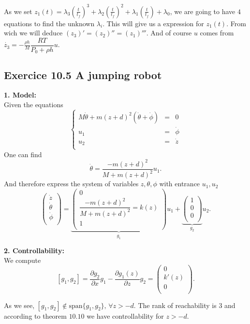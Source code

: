 As we set $z_{1}(t)=\lambda_{3}(\frac{t}{t_{f}})^{3}+\lambda_{2}(\frac{t}{t_{f}})^{2}+\lambda_{1}(\frac{t}{t_{f}})+\lambda_{0}$, we are going to have $4$ equations to find the unknown $\lambda_{i}$. This will give us a expression for $z_{1}(t)$. From wich we will deduce $(z_{3})'=(z_{2})''=(z_{1})'''$. And of course $u$ comes from $\dot{z_{3}}  =  -\frac{\rho h}{M}\dfrac{RT}{P_{0}+\rho h}u$.

\subsection*{Exercice 10.5 A jumping robot}

\textbf{1. Model:}\\

Given the equations 
$$\left\{ \begin{array}{rrr}
M\dot{\theta}+ m(z+d)^{2}(\dot{\theta}+\dot{\phi}) & = & 0\\
u_{1} & = & \dot{\phi}\\
u_{2} & = & \dot{z}\\
\end{array}\right.$$
One can find $$\dot{\theta}=\dfrac{-m(z+d)^{2}}{M+m(z+d)^{2}}u_{1}.$$
And therefore express the system of variables $z, \theta, \phi$ with entrance $u_{1}, u_{2}$
$$\begin{pmatrix}
\dot{z}\\
\dot{\theta}\\
\dot{\phi}\\
\end{pmatrix}=
\underbrace{
\begin{pmatrix}
0\\
\dfrac{-m(z+d)^{2}}{M+m(z+d)^{2}}=k(z)\\
1\\
\end{pmatrix}}_{g_{1}}u_{1}+
\underbrace{
\begin{pmatrix}
1\\
0\\
0\\
\end{pmatrix}}_{g_{2}}u_{2}.$$

\textbf{2. Controllability:}\\

We compute
$$[g_{1},g_{2}]=\dfrac{\partial g_{2}}{\partial x}g_{1}-\dfrac{\partial g_{1}(z)}{\partial z}g_{2}=\begin{pmatrix}
0\\
k'(z)\\
0\\
\end{pmatrix}.$$

As we see, $[g_{1},g_{2}]\notin \text{span}\{g_{1},g_{2}\}\text{, } \forall z>-d$. The rank of reachability is $3$ and according to theorem $10.10$ we have controllability for $z>-d$.

